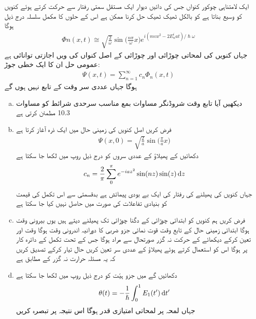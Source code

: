 ایک لامتناہی چوکور کنواں جس کی دائیں دیوار ایک مستقل سمتی رفتار  سے حرکت کرتے ہوئے کنویں کو وسیع بناتا ہے کو بالکل ٹھیک ٹھیک حل کرنا ممکن ہے اس کے حلوں کا مکمل سلسلہ درج ذیل ہوگا 
\begin{align}
\Phi n (x, t) \cong \sqrt{\frac{2}{\omega}} \sin \big ( \frac{n \pi}{\omega} x \big ) e^{i(mvx^2 -2E_n^i at)/\hslash \omega}
\end{align}
جہاں  کنویں کی لمحاتی چوڑائی اور چوڑائی  کے اصل کنواں کی  ویں اجازتی توانائی  ہے عمومی حل ان  کا ایک خطی جوڑ:
\begin{align}
\Psi (x, t) = \sum_{n = 1}^{\infty} c_n \Phi_n (x, t)
\end{align}
ہوگا جہاں عددی سر  وقت  کے تابع نہیں ہوں گے 
\begin{enumerate}[a.]
\item
دیکھیں آیا تابع وقت شروڈنگر مساوات بمع مناسب سرحدی شرائط کو مساوات 10.3  مطمئن کرتی ہے 
\item
فرض کریں اصل کنویں کی زمینی حال میں ایک ذرہ آغاز   کرتا ہے  
\begin{align*}
\Psi (x, 0) = \sqrt{\frac{2}{a}} \sin \big ( \frac{\pi}{a} x \big )
\end{align*}
دکھائیں کے پھیلاؤ کے عددى سروں کو درج ذیل روپ میں لکھا جا سکتا ہے 
\begin{align}
c_n = \frac{2}{\pi} \sum_0^{\pi} e^{-iaz^2} \sin(nz) \sin(z) \dif z
\end{align}
جہاں 
کنویں کی پھیلنے کی رفتار کی ایک بے بودی پیمائش ہے بدقسمتی سے اس تکمل کی قیمت کو بنیادی تفاعلات کی صورت میں حاصل نہیں کیا جا سکتا ہے 
\item
فرض کریں ہم کنویں کو ابتدائی چوڑائی کے دگنا چوڑائی تک پھیلنے دیتے ہیں یوں بیرونی وقت  ہوگا ابتدائی زمینی حال کے تابع وقت قوت نمائی جزو ضربی کا دورانیہ اندرونی وقت ہوگا وقت  اور  تعین کرکے دیکھائے کے حرکت نہ گزر  صورتحال سے مراد  ہوگا جس کے تحت تکمل کے دائرہ کار پر  ہوگا اس کو استعمال کرتے ہوئے پھیلاؤ کے عددی سر  تعین کریں حال  تیار کرکے تصدیق کریں کہ یہ مسئلہ حرارت نہ گزر کے مطابق ہے 
\item
دکھائیں گے  میں جزو ہيّت کو درج ذیل روپ میں لکھا جا سکتا ہے 
\begin{align}
\theta (t) = - \frac{1}{\hslash} \int_0^1 E_1 (t') \dif t'
\end{align}
جہاں لمحہ  پر لمحاتی امتیازی قدر  ہوگا اس نتیجہ پر تبصرہ کریں 
\end{enumerate}
